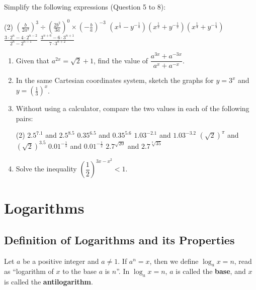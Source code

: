 \documentclass{report}
\begin{document}
\vspace{-0.5em}
\noindent Simplify the following expressions (Question 5 to 8):
\begin{tasks}[label=\arabic*., start=5](2)
	\task $\displaystyle\left(\frac{b}{2 a^2}\right)^3 \div\left(\frac{2 b^2}{3 a}\right)^0 \times\left(-\frac{b}{a}\right)^{-3}$
	\task $\displaystyle\left(x^{\frac{1}{4}}-y^{-\frac{1}{4}}\right)\left(x^{\frac{1}{2}}+y^{-\frac{1}{2}}\right)\left(x^{\frac{1}{4}}+y^{-\frac{1}{4}}\right)$
	\task $\displaystyle\frac{3 \cdot 2^n-4 \cdot 2^{n-2}}{2^n-2^{n-1}}$
	\task $\displaystyle\frac{3^{n+6}-6 \cdot 3^{n+1}}{7 \cdot 3^{n+2}}$
\end{tasks}

\vspace{-1.5em}
\begin{enumerate}[start=9]
	\item Given that $a^{2 x}=\sqrt{2}+1$, find the value of $\dfrac{a^{3 x}+a^{-3 x}}{a^x+a^{-x}}$.
	\item In the same Cartesian coordinates system, sketch the graphs for $y=3^x$ and $y=\left(\frac{1}{3}\right)^x$.
	\item Without using a calculator, compare the two values in each of the following pairs:
	      \begin{tasks}[label=(\alph*)](2)
	      	\task $2.5^{7.1}$ and $2.5^{8.5}$
	      	\task $0.35^{6.5}$ and $0.35^{5.6}$
	      	\task $1.03^{-2.1}$ and $1.03^{-3.2}$
	      	\task $(\sqrt{2})^\pi$ and $(\sqrt{2})^{3.5}$
	      	\task $0.01^{-\frac{1}{3}}$ and $0.01^{-\frac{1}{2}}$
	      	\task $2.7^{\sqrt{20}}$ and $2.7^{\sqrt[3]{35}}$
	      \end{tasks}
	\item Solve the inequality $\left(\dfrac{1}{2}\right)^{3 x-x^2}<1$.
\end{enumerate}
        
\section{Logarithms}

\subsection*{Definition of Logarithms and its Properties}

Let $a$ be a positive integer and $a \neq 1$. If $a^n = x$, then we define $\log_a x = n$, read as ``logarithm of $x$ to the base $a$ is $n$''. In $\log_a x = n$, $a$ is called the \textbf{base}, and $x$ is called the \textbf{antilogarithm}.
\end{document}
